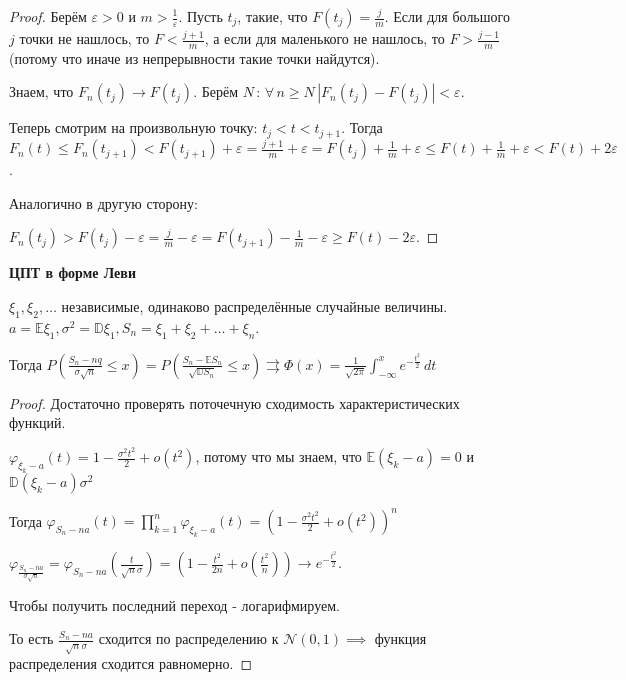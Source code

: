 \begin{proof}
    Берём $\varepsilon > 0$ и $m > \frac{1}{\varepsilon}$. Пусть $t_j$, такие, что $F(t_j) = \frac{j}{m}$. Если для большого $j$ точки не нашлось, то
    $F < \frac{j + 1}{m}$, а если для маленького не нашлось, то $F > \frac{j - 1}{m}$ (потому что иначе из непрерывности такие точки найдутся).

    Знаем, что $F_n(t_j) \rightarrow F(t_j)$. Берём $N \, : \, \forall \, n \geqslant N \, |F_n(t_j) - F(t_j)| < \varepsilon$.

    Теперь смотрим на произвольную точку: $t_j < t < t_{j + 1}$. Тогда 
    $F_n(t) \leqslant F_n(t_{j + 1}) < F(t_{j + 1}) + \varepsilon = \frac{j + 1}{m} + \varepsilon = F(t_j) + \frac{1}{m} + \varepsilon \leqslant F(t) + \frac{1}{m} + \varepsilon < F(t) + 2\varepsilon$.

    Аналогично в другую сторону:

    $F_n (t_j) > F(t_j) - \varepsilon = \frac{j}{m} - \varepsilon = F(t_{j + 1}) - \frac{1}{m} - \varepsilon \geqslant F(t) - 2\varepsilon$.

\end{proof}


\begin{theorem}
    \textbf{ЦПТ в форме Леви}

    $\xi_1, \xi_2, \ldots $ независимые, одинаково распределённые случайные величины. $a = \mathbb{E} \xi_1, 
    \sigma^2 = \mathbb{D} \xi_1, S_n = \xi_1 + \xi_2 + \ldots + \xi_n$.

    Тогда $P \left ( \frac{S_n - nq}{\sigma \sqrt{n}} \leqslant x \right ) = P\left ( \frac{S_n - \mathbb{E} S_n}{\sqrt{\mathbb{D} S_n}} \leqslant x \right ) \rightrightarrows \Phi (x) = \frac{1}{\sqrt{2\pi}} \int_{-\infty}^x e^{-\frac{t^2}{2}} \, dt$
\end{theorem}

\begin{proof}
    Достаточно проверять поточечную сходимость характеристических функций.

    $\varphi_{\xi_k - a} (t) = 1 - \frac{\sigma^2 t^2}{2} + o(t^2)$, потому что 
    мы знаем, что $\mathbb{E} (\xi_k - a) = 0$ и $\mathbb{D} (\xi_k - a) \sigma^2$

    Тогда $\varphi_{S_n - na} (t) = \prod\limits_{k = 1}^n \varphi_{\xi_k - a} (t) = \left ( 1 - \frac{\sigma^2t^2}{2} + o(t^2) \right )^n$

    $\varphi_{\frac{S_n - na}{\sigma \sqrt{n}}} = \varphi_{S_n - na} \left ( \frac{t}{\sqrt{n}\sigma} \right ) = \left( 1 - \frac{t^2}{2n} + o(\frac{t^2}{n}) \right) \rightarrow e^{-\frac{t^2}{2}}$.

    Чтобы получить последний переход - логарифмируем.

    То есть $\frac{S_n - na}{\sqrt{n} \sigma}$ сходится по распределению к $\mathcal{N} (0, 1) \implies$ функция распределения сходится равномерно.
\end{proof}

